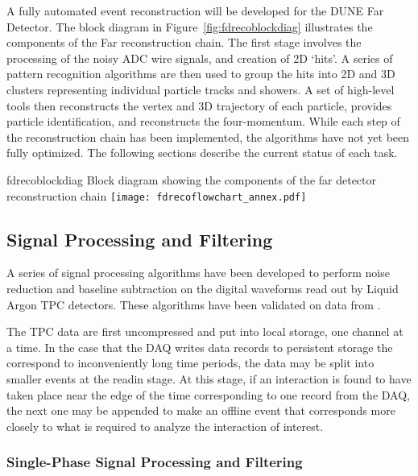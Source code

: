 A fully automated event reconstruction will be developed for the
DUNE Far Detector. The block diagram in Figure~\ref{fig:fdrecoblockdiag}
illustrates the components of the Far reconstruction chain. 
The first stage involves the processing of the noisy ADC wire signals,
and creation of 2D `hits'. A series of pattern recognition algorithms
are then used to group the hits into 2D and 3D clusters representing 
individual particle tracks and showers. A set of high-level tools
then reconstructs the vertex and 3D trajectory of each particle,
provides particle identification, and reconstructs the four-momentum.
While each step of the reconstruction chain has been implemented,
the algorithms have not yet been fully optimized.
The following sections describe the current status of each task.

\begin{cdrfigure}{fdrecoblockdiag}
{Block diagram showing the components of the far detector reconstruction chain}
\texttt{[image: fdrecoflowchart\_annex.pdf]}
\end{cdrfigure}

\subsection{Signal Processing and Filtering}

A series of signal processing algorithms have been developed to
perform noise reduction and baseline subtraction on the digital
waveforms read out by Liquid Argon TPC detectors. 
These algorithms have been validated on data from 
.

The TPC data are first uncompressed and put into local storage, one channel at a time.  
In the case that the DAQ writes data records to persistent
storage the correspond to inconveniently long time periods, the data may be split
into smaller events at the readin stage.  At this stage, if an interaction is found
to have taken place near the edge of the time corresponding to one record from the DAQ,
the next one may be appended to make an offline event that corresponds more closely to
what is required to analyze the interaction of interest.

\subsubsection{Single-Phase Signal Processing and Filtering}

